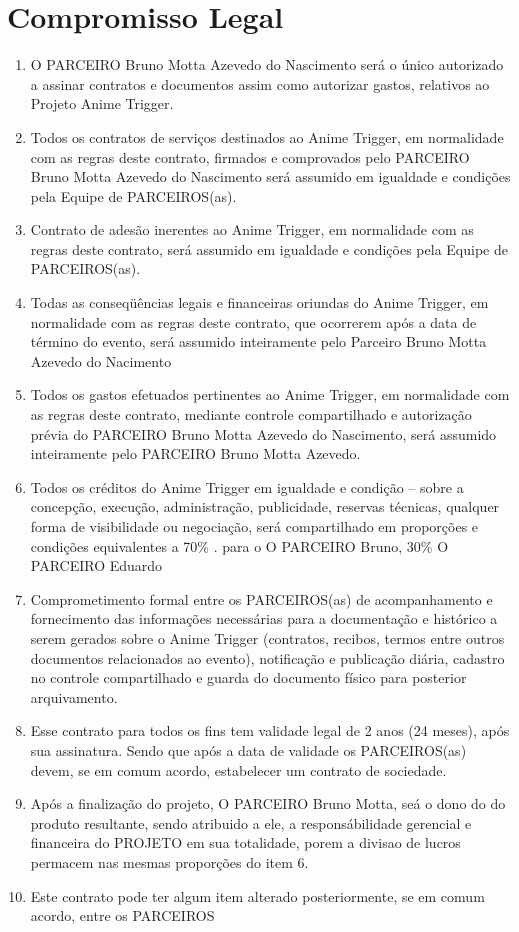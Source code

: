 \documentclass[article]{abntex2}
\begin{document}
\section*{Compromisso Legal}
\begin{enumerate}
	\item{O PARCEIRO Bruno Motta Azevedo do Nascimento será o único autorizado a assinar contratos e documentos assim como autorizar gastos, relativos ao Projeto Anime Trigger.}
	\item{Todos os contratos de serviços destinados ao Anime Trigger, em normalidade com as regras deste contrato, firmados e comprovados pelo PARCEIRO Bruno Motta Azevedo do Nascimento será assumido em igualdade e condições pela Equipe de PARCEIROS(as).}
	\item{Contrato de adesão inerentes ao Anime Trigger, em normalidade com as regras deste contrato, será assumido em igualdade e condições pela Equipe de PARCEIROS(as).}
	\item{Todas as conseqüências legais e financeiras oriundas do Anime Trigger, em normalidade com as regras deste contrato, que ocorrerem após a data de término do evento, será assumido inteiramente pelo Parceiro Bruno Motta Azevedo do Nacimento}
	\item{Todos os gastos efetuados pertinentes ao Anime Trigger, em normalidade com as regras deste contrato, mediante controle compartilhado  e autorização prévia do PARCEIRO Bruno Motta Azevedo do Nascimento, será assumido inteiramente pelo PARCEIRO Bruno Motta Azevedo.}
	\item{Todos os créditos do Anime Trigger em igualdade e condição – sobre a concepção, execução, administração, publicidade, reservas técnicas, qualquer forma de visibilidade ou negociação, será compartilhado em proporções e condições equivalentes a 70\% . para o O PARCEIRO Bruno, 30\% O PARCEIRO Eduardo}
	\item{Comprometimento formal entre os PARCEIROS(as) de acompanhamento e fornecimento das informações necessárias para a documentação e histórico a serem gerados sobre o Anime Trigger (contratos, recibos, termos entre outros documentos relacionados ao evento), notificação e publicação diária, cadastro no controle compartilhado e guarda do documento físico para posterior arquivamento.}
	\item{Esse contrato para todos os fins tem validade legal de 2 anos (24 meses), após sua assinatura. Sendo que após a data de validade os PARCEIROS(as) devem, se em comum acordo, estabelecer um contrato de sociedade.}
	\item{Após a finalização do projeto, O PARCEIRO Bruno Motta, seá o dono do do produto resultante, sendo atribuido a ele, a responsábilidade gerencial e financeira do PROJETO em sua totalidade, porem a divisao de lucros permacem nas mesmas proporções do item 6.}
	\item{Este contrato pode ter algum item alterado posteriormente, se em comum acordo, entre os PARCEIROS}
\end{enumerate}
\end{document}
